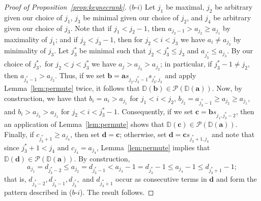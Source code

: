 \documentclass[letterpaper,10pt]{article}
\newcommand{\bl}[1]{{\color{blue} #1}}
\begin{document}
\begin{proof}[Proof of Proposition~\ref{prop:keynecrank}]
\noindent
$(b$-$i)$ Let $j_1$ be maximal, $j_2$ be arbitrary given our choice of $j_1$, $j_3$ be minimal given our choice of $j_2$, and $j_4$ be arbitrary given our choice of $j_3$. Note that if $j_1<j_2-1$, then $a_{j_2-1}>a_{j_2}\ge a_{j_1}$ by maximality of $j_1$; and if $j_2<j_3-1$, then for $j_2<i<j_3$ we have $a_i\neq a_{j_3}$ by minimality of $j_3$. Let $j_3^*$ be minimal such that $j_2<j_3^*\le j_3$ and $a_{j_3^*}\le a_{j_3}$. By our choice of $j_3^*,$ for $j_2<j<j_3^*$ we have $a_j>a_{j_3}>a_{j_2}$; in particular, if $j_3^*-1\neq j_2,$ then $a_{j_3^*-1}>a_{j_2}$. Thus, if we set $\mathbf{b}=\mathbf{a}s_{j_2,j_3^*-1}s_{j_3^*,j_3}$ and apply Lemma~\ref{lem:permute} twice, it follows that $\mathbb{D}(\mathbf{b})\in \mathcal{P}(\mathbb{D}(\mathbf{a})).$ Now, by construction, we have that $b_i=a_i>a_{j_1}$ for $j_1<i<j_2$, $b_{j_2}=a_{j_3^*-1}\ge a_{j_2}\ge a_{j_1}$, and $b_{i}>a_{j_3}> a_{j_1}$ for $j_2<i<j_3^*-1$. Consequently, if we set $\mathbf{c}=\mathbf{b}s_{j_1,j_3^*-2}$, then an application of Lemma~\ref{lem:permute} shows that $\mathbb{D}(\mathbf{c})\in \mathcal{P}(\mathbb{D}(\mathbf{a}))$. Finally, if $c_{j^*_3+1}\ge a_{j_4}$, then set $\mathbf{d}=\mathbf{c}$; otherwise, set $\mathbf{d}=\mathbf{c}s_{j^*_3+1,j_4}$ and note that since $j_3^*+1< j_4$ and $c_{j_4}=a_{j_4}$, Lemma~\ref{lem:permute} implies that $\mathbb{D}(\mathbf{d})\in \mathcal{P}(\mathbb{D}(\mathbf{a}))$. By construction, $$a_{j_1}=d_{j_3^*-2}\le a_{j_2}=d_{j_3^*-1}<a_{j_3}-1=d_{j_3^*}-1\le a_{j_4}-1\le d_{j_3^*+1}-1;$$ that is, $d_{j_3^*-2},d_{j_3^*-1},d_{j_3^*},$ and $d_{j_3^*+1}$ occur as consecutive terms in $\mathbf{d}$ and form the pattern described in ($b$-$i$). The result follows.
\end{proof}

\end{document}
